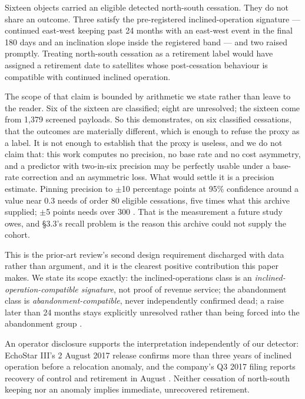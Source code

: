 \documentclass[11pt]{article}
\begin{document}

Sixteen objects carried an eligible detected north-south cessation. They do not share an outcome. Three satisfy the pre-registered inclined-operation signature --- continued east-west keeping past 24 months with an east-west event in the final 180 days and an inclination slope inside the registered band --- and two raised promptly. Treating north-south cessation as a retirement label would have assigned a retirement date to satellites whose post-cessation behaviour is compatible with continued inclined operation.

The scope of that claim is bounded by arithmetic we state rather than leave to the reader. Six of the sixteen are classified; eight are unresolved; the sixteen come from 1,379 screened payloads. So this demonstrates, on six classified cessations, that the outcomes are materially different, which is enough to refuse the proxy as a label. It is not enough to establish that the proxy is useless, and we do not claim that: this work computes no precision, no base rate and no cost asymmetry, and a predictor with two-in-six precision may be perfectly usable under a base-rate correction and an asymmetric loss. What would settle it is a precision estimate. Pinning precision to $\pm$10 percentage points at 95\% confidence around a value near 0.3 needs of order 80 eligible cessations, five times what this archive supplied; $\pm$5 points needs over 300%
. That is the measurement a future study owes, and \S{}3.3's recall problem is the reason this archive could not supply the cohort.

This is the prior-art review's second design requirement discharged with data rather than argument, and it is the clearest positive contribution this paper makes. We state its scope exactly: the inclined-operations class is an \emph{inclined-operation-compatible signature}, not proof of revenue service; the abandonment class is \emph{abandonment-compatible}, never independently confirmed dead; a raise later than 24 months stays explicitly unresolved rather than being forced into the abandonment group%
.

An operator disclosure supports the interpretation independently of our detector: EchoStar III's 2 August 2017 release confirms more than three years of inclined operation before a relocation anomaly, and the company's Q3 2017 filing reports recovery of control and retirement in August%
. Neither cessation of north-south keeping nor an anomaly implies immediate, unrecovered retirement.
\end{document}
